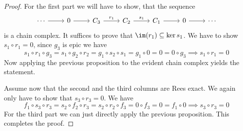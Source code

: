\begin{proof}[Proof]
    For the first part we will have to show, that the sequence 
    \[\begin{tikzcd}
        \cdots & 0 & {C_3} & {C_2} & {C_1} & 0 & \cdots
        \arrow[from=1-1, to=1-2]
        \arrow[from=1-2, to=1-3]
        \arrow["{r_1}", from=1-3, to=1-4]
        \arrow["{s_1}", from=1-4, to=1-5]
        \arrow[from=1-5, to=1-6]
        \arrow[from=1-6, to=1-7]
    \end{tikzcd}\]
    is a chain complex. It suffices to prove that $\im(r_1)\subseteq\ker{s_1}$.
    We have to show $s_1\circ r_1 = 0$, since $g_3$ is epic we have 
    \[
        s_1\circ r_1\circ g_3 = s_1\circ g_2\circ r_2 = g_1\circ s_2\circ s_1 = g_1 \circ 0 = 0 = 0\circ g_3 \implies s_1\circ r_1 = 0
    \]
    Now applying the previous proposition to the evident chain complex yields the statement.\par
    Assume now that the second and the third columns are Rees exact. We again only have to show that 
    $s_3\circ r_3 = 0$. We have 
    \[
    f_1\circ s_3\circ r_3 = s_2 \circ f_2 \circ r_3 = s_2 \circ r_2 \circ f_3 = 0\circ f_3 = 0 = f_1\circ 0 \implies s_3\circ r_3 = 0
    \]
    For the third part we can just directly apply the previous proposition. This completes the proof.
\end{proof}
